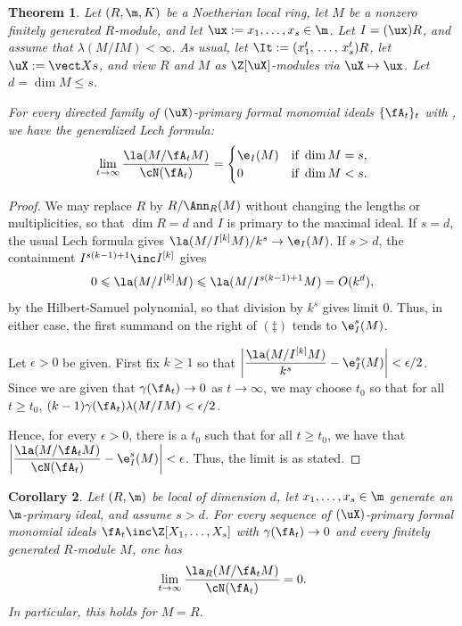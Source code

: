 \documentclass[12pt]{amsart}
\theoremstyle{plain}
\newtheorem{theorem}{Theorem}[section]
\newtheorem{corollary}[theorem]{Corollary}
\theoremstyle{remark}
\theoremstyle{definition}
\numberwithin{equation}{theorem}
\renewcommand{\geq}{\geqslant} \renewcommand{\leq}{\leqslant}
\begin{document}
\begin{theorem}\label{genLECH}
Let $(R,\m,K)$ be a Noetherian local ring, let $M$ be a nonzero
finitely generated $R$-module, and let $\ux : = x_1,\ldots,x_s\in \m$.
Let $I=(\ux)R$,  and assume that $\lambda(M/IM)<\infty$. 
As usual, let $\It := (x_1^t, \, \ldots, \, x_s^t)R$, let $\uX := \vect X s$, 
and view $R$ and $M$ as $\Z[\uX]$-modules via $\uX \mapsto \ux$. 
Let  $d=\dim M\leq s$.

For every directed family of $(\uX)$-primary formal monomial ideals 
$\{\fA_t\}_t$ with \asb, we have the generalized Lech formula:
\[ \lim_{t\to\infty}\frac{\la(M/\fA_t M)}{\cN(\fA_t)}
 =\begin{cases}\e_I(M)&\text{if }\dim M=s,\\0&\text{if }\dim M<s.\end{cases}
\]
\end{theorem}
\begin{proof} We may replace $R$ by
$R/\Ann_R(M)$ without changing the lengths or multiplicities, so
that $\dim R=d$ and $I$ is primary to the maximal ideal.
If $s=d$, the usual Lech formula
\cite[Theorem~11.2.10]{SwHu06} gives
$\la(M/I^{[k]}M)/k^s\to\e_I(M)$.
If $s>d$, the containment
$I^{s(k-1)+1}\inc I^{[k]}$ gives
\[0\leq\la(M/I^{[k]}M) \leq \la(M/I^{s(k-1)+1}M)=O(k^d),\]
by the Hilbert-Samuel polynomial, so that division by $k^s$ gives
limit $0$. Thus, in either case, the first summand on the right
of $(\ddagger)$ tends to $\e_I^s(M)$.

Let $\epsilon > 0$  be given.  First fix 
$k \geq 1$ so that 
$\displaystyle \left|\frac{\la(M/I^{[k]} M)}{k^s} - \e^s_I(M) \right| 
< \epsilon/2$. 
Since we are given that $\gamma(\fA_t) \to 0$
as $t \to \infty$, we may choose $t_0$ so that for all $t \geq t_0$,
$(k-1)\gamma(\fA_t)\lambda(M/IM) < \epsilon/2$.

Hence, for every $\epsilon > 0$, there is a 
$t_0$ such that for all $t \geq t_0$, we have that\ \ 
$\displaystyle \left|\frac{\la(M/\fA_t M)}{\cN(\fA_t)}-\e_I^s(M)\right|<\epsilon$. 
Thus, the limit is as stated.
\end{proof}


\begin{corollary}\label{LECH-s-big}
Let $(R,\m)$ be local of dimension $d$, let
$x_1,\ldots,x_s \in \m$ generate an $\m$-primary ideal, and assume
$s>d$. For every sequence of $(\uX)$-primary formal monomial ideals
$\fA _t \inc \Z[X_1,\ldots,X_s]$ with $\gamma(\fA _t)\to 0$ and
every finitely generated $R$-module $M$, one has
\[
 \lim_{t\to\infty}\frac{\la_R(M/\fA _t M)}{\cN(\fA_t)}=0.
\]
In particular, this holds for $M=R$.
\end{corollary}
\end{document}
